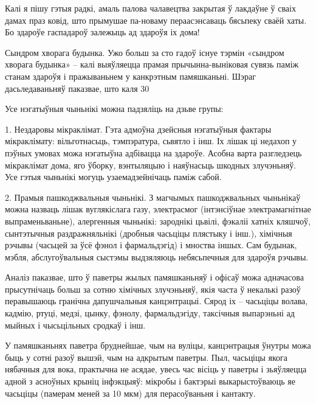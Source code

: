 Калі я пішу гэтыя радкі, амаль палова чалавецтва закрытая ў лакдаўне ў сваіх дамах праз ковід, што прымушае па-новаму пераасэнсаваць бясьпеку сваёй хаты. Бо здароўе гаспадароў залежыць ад здароўя іх дома!

Сындром хворага будынка. Ужо больш за сто гадоў існуе тэрмін «сындром хворага будынка» – калі выяўляецца прамая прычынна-выніковая сувязь паміж станам здароўя і пражываньнем у канкрэтным памяшканьні. Шэраг дасьледаваньняў паказвае, што каля 30%

Усе нэгатыўныя чыньнікі можна падзяліць на дзьве групы:

1. Нездаровы мікраклімат. Гэта адмоўна дзейсныя нэгатыўныя фактары мікраклімату: вільготнасьць, тэмпэратура, сьвятло і інш. Іх лішак ці недахоп у пэўных умовах можа нэгатыўна адбівацца на здароўе. Асобна варта разгледзець мікраклімат дома, яго ўборку, вэнтыляцыю і наяўнасьць шкодных злучэньняў. Усе гэтыя чыньнікі могуць узаемадзейнічаць паміж сабой.

2. Прамыя пашкоджвальныя чыньнікі. З магчымых пашкоджвальных чыньнікаў можна назваць лішак вуглякіслага газу, электрасмог (інтэнсіўнае электрамагнітнае выпраменьваньне), алергенныя чыньнікі: зароднікі цьвілі, фэкаліі хатніх кляшчоў, сынтэтычныя раздражняльнікі (дробныя часьціцы плястыку і інш.), хімічныя рэчывы (часьцей за ўсё фэнол і фармальдэгід) і мноства іншых. Сам будынак, мэбля, абслугоўвальныя сыстэмы выдзяляюць небясьпечныя для здароўя рэчывы.

Аналіз паказвае, што ў паветры жылых памяшканьняў і офісаў можа адначасова прысутнічаць больш за сотню хімічных злучэньняў, якія часта ў некалькі разоў перавышаюць гранічна дапушчальныя канцэнтрацыі. Сярод іх – часьціцы волава, кадмію, ртуці, медзі, цынку, фэнолу, фармальдэгіду, таксічныя выпарэньні ад мыйных і чысьцільных сродкаў і інш.

У памяшканьнях паветра бруднейшае, чым на вуліцы, канцэнтрацыя ўнутры можа быць у сотні разоў вышэй, чым на адкрытым паветры. Пыл, часьціцы якога нябачныя для вока, практычна не асядае, увесь час вісіць у паветры і зьяўляецца адной з асноўных крыніц інфэкцыяў: мікробы і бактэрыі выкарыстоўваюць яе часьціцы (памерам меней за 10 мкм) для перасоўваньня і кантакту.

